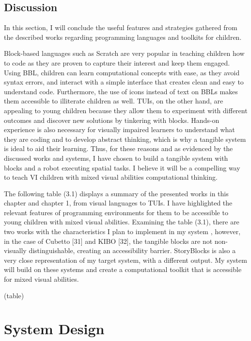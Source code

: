 \documentclass[oneside,%
                    author={Malak Hajji},
                    degree={BSc},
                    title={Designing An Accessible Computational Toolkit For Students},
                  subtitle={With Mixed Visual Abilities}]{dissertation}
\begin{document}
\section{Discussion} 
In this section, I will conclude the useful features and strategies gathered from the described works regarding programming languages and toolkits for children. 

Block-based languages such as Scratch are very popular in teaching children how to code as they are proven to capture their interest and keep them engaged. Using BBL, children can learn computational concepts with ease, as they avoid syntax errors, and interact with a simple interface that creates clean and easy to understand code. Furthermore, the use of icons instead of text on BBLs makes them accessible to illiterate children as well. 
TUIs, on the other hand, are appealing to young children because they allow them to experiment with different outcomes and discover new solutions by tinkering with blocks. 
Hands-on experience is also necessary for visually impaired learners to understand what they are coding and to develop abstract thinking, which is why a tangible system is ideal to aid their learning. Thus, for these reasons and as evidenced by the discussed works and systems, I have chosen to build a tangible system with blocks and a robot executing spatial tasks. I believe it will be a compelling way to teach VI children with mixed visual abilities computational thinking.

The following table (3.1) displays a summary of the presented works in this chapter and chapter 1, from visual languages to TUIs.
I have highlighted the relevant features of programming environments for them to be accessible to young children with mixed visual abilities. 
Examining the table (3.1), there are two works with the characteristics I plan to implement in my system , however, in the case of Cubetto [31] and KIBO [32], the tangible blocks are not non-visually distinguishable, creating an accessibility barrier. StoryBlocks is also a very close representation of my target system, with a different output. My system will build on these systems and create a computational toolkit that is accessible for mixed visual abilities. 

(table)


\chapter{System Design}
\end{document}
